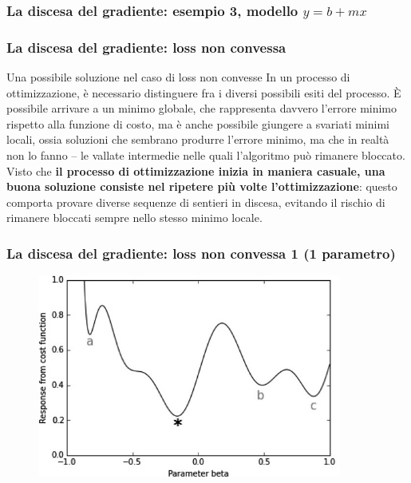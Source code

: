\begin{frame}

	\frametitle{La discesa del gradiente: esempio 3, modello $y=b+mx$}

		\centering

\end{frame}



\begin{frame}

	\frametitle{La discesa del gradiente: loss non convessa}

	\begin{block}{Una possibile soluzione nel caso di loss non convesse}
		In un processo di ottimizzazione, è necessario distinguere fra i diversi possibili esiti del processo. È possibile arrivare a un minimo globale, che rappresenta davvero l’errore minimo rispetto alla funzione di costo, ma è anche possibile giungere a svariati minimi locali, ossia soluzioni che sembrano produrre l’errore minimo, ma che in realtà non lo fanno – le vallate intermedie nelle quali l’algoritmo può rimanere bloccato.
		\newlinedouble
		Visto che \textbf{il processo di ottimizzazione inizia in maniera casuale, una buona soluzione consiste nel ripetere più volte l’ottimizzazione}: questo comporta provare diverse sequenze di sentieri in discesa, evitando il rischio di rimanere bloccati sempre nello stesso minimo locale.
	\end{block}

\end{frame}



\begin{frame}

	\frametitle{La discesa del gradiente: loss non convessa 1 (1 parametro)}

		\begin{figure}[!htbp]
			\centering
			\includegraphics[width=10cm]{images/supervised/training_reducing_loss/non_convex_1.jpg}
		\end{figure}


\end{frame}


